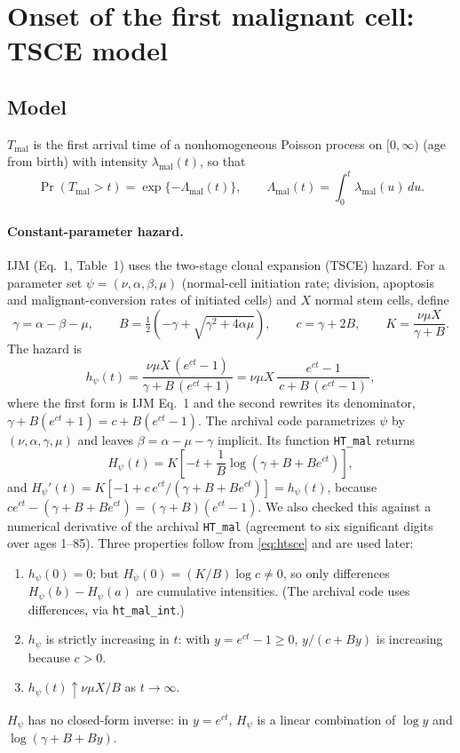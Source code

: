 \documentclass[11pt]{article}
\newcommand{\code}[1]{\texttt{#1}}
\newcommand{\Tmal}{T_{\mathrm{mal}}}
\begin{document}
\section{Onset of the first malignant cell: TSCE model}\label{sec:onset}

\subsection{Model}

$\Tmal$ is the first arrival time of a nonhomogeneous Poisson process on
$[0,\infty)$ (age from birth) with intensity $\lambda_{\mathrm{mal}}(t)$, so that
\[
\Pr(\Tmal > t) = \exp\{-\Lambda_{\mathrm{mal}}(t)\}, \qquad
\Lambda_{\mathrm{mal}}(t)=\int_0^t \lambda_{\mathrm{mal}}(u)\,du .
\]

\paragraph{Constant-parameter hazard.} IJM (Eq.~1, Table~1) uses the two-stage
clonal expansion (TSCE) hazard. For a parameter set
$\psi = (\nu,\alpha,\beta,\mu)$ (normal-cell initiation rate; division, apoptosis
and malignant-conversion rates of initiated cells) and $X$ normal stem cells,
define
\[
\gamma = \alpha-\beta-\mu, \qquad
B = \tfrac12\left(-\gamma + \sqrt{\gamma^2 + 4\alpha\mu}\right), \qquad
c = \gamma + 2B, \qquad
K = \frac{\nu\mu X}{\gamma + B}.
\]
The hazard is
\begin{equation}\label{eq:htsce}
h_\psi(t) = \frac{\nu\mu X\,(e^{ct}-1)}{\gamma + B\,(e^{ct}+1)}
          = \nu\mu X\,\frac{e^{ct}-1}{\,c + B\,(e^{ct}-1)\,},
\end{equation}
where the first form is IJM Eq.~1 and the second rewrites its denominator,
$\gamma+B(e^{ct}+1) = c + B(e^{ct}-1)$. The archival code parametrizes $\psi$ by
$(\nu,\alpha,\gamma,\mu)$ and leaves $\beta=\alpha-\mu-\gamma$ implicit. Its
function \code{HT\_mal} returns
\begin{equation}\label{eq:Htsce}
H_\psi(t) = K\left[-t + \frac1B \log\!\left(\gamma + B + B e^{ct}\right)\right],
\end{equation}
and $H_\psi'(t) = K\left[-1 + c\,e^{ct}/(\gamma+B+Be^{ct})\right] = h_\psi(t)$,
because $c e^{ct} - (\gamma+B+Be^{ct}) = (\gamma+B)(e^{ct}-1)$. We also checked
this against a numerical derivative of the archival \code{HT\_mal} (agreement to six
significant digits over ages 1--85). Three properties follow from
\eqref{eq:htsce} and are used later:
\begin{enumerate}[nosep]
\item $h_\psi(0)=0$; but $H_\psi(0) = (K/B)\log c \neq 0$, so only differences
  $H_\psi(b)-H_\psi(a)$ are cumulative intensities. (The archival code uses
  differences, via \code{ht\_mal\_int}.)
\item $h_\psi$ is strictly increasing in $t$: with $y=e^{ct}-1\ge 0$,
  $y/(c+By)$ is increasing because $c>0$.
\item $h_\psi(t) \uparrow \nu\mu X / B$ as $t\to\infty$.
\end{enumerate}
$H_\psi$ has no closed-form inverse: in $y=e^{ct}$, $H_\psi$ is a linear
combination of $\log y$ and $\log(\gamma+B+By)$.
\end{document}
